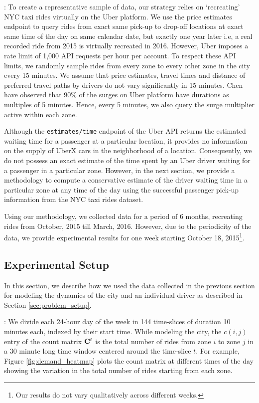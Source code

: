 :
To create a representative sample of data, our strategy relies on `recreating' NYC taxi rides virtually on the Uber platform. We use the price estimates endpoint to query rides from exact same pick-up to drop-off locations at exact same time of the day on same calendar date, but exactly one year later i.e, a real recorded ride from 2015 is virtually recreated in 2016. However, Uber imposes a rate limit of 1,000 API requests per hour per account. To respect these API limits, we randomly sample rides from every zone to every other zone in the city every 15 minutes. We assume that price estimates, travel times and distance of preferred travel paths by drivers do not vary significantly in 15 minutes. Chen {\etal}~\cite{chen2015peeking} have observed that 90\% of the surges on Uber platform have durations as multiples of 5 minutes. Hence, every 5 minutes, we also query the surge multiplier active within each zone.

Although the \texttt{estimates/time} endpoint of the Uber API returns the estimated waiting time for a passenger at a particular location, it provides no information on the supply of UberX cars in the neighborhood of a location. Consequently, we do not possess an exact estimate of the time spent by an Uber driver waiting for a passenger in a particular zone. However, in the next section, we provide a methodology to compute a conservative estimate of the driver waiting time in a particular zone at any time of the day using the successful passenger pick-up information from the NYC taxi rides dataset.

Using our methodology, we collected data for a period of 6 months, recreating rides from October, 2015 till March, 2016. However, due to the periodicity of the data, we provide experimental results for one week starting October 18, 2015\footnote{Our results do not vary qualitatively across different weeks.}.

\subsection{Experimental Setup}
In this section, we describe how we used the data collected in the previous section for modeling the dynamics of the city and an individual driver as described in Section \ref{sec:problem_setup}.


:
We divide each 24-hour day of the week in 144 time-slices of duration 10 minutes each, indexed by their start time. While modeling the city, the $c(i,j)$ entry of the count matrix ${\mathbf{C}}^t$ is the total number of rides from zone $i$ to zone $j$ in a 30 minute long time window centered around the time-slice $t$.  For example, Figure \ref{fig:demand_heatmap} plots the count matrix {\countmatrix} at different times of the day showing the variation in the total number of rides starting from each zone.


